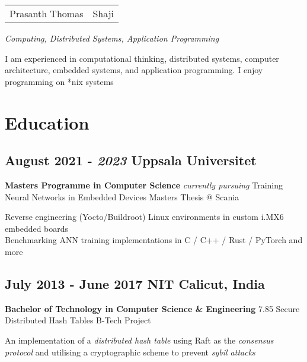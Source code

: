 \documentclass{scrartcl}
\begin{document}
\newcommand{\hll}[1]{{\color{RawSienna}#1}}
\newcommand{\hlp}[1]{{\color{Maroon}#1}}

	\begin{center}
		\begin{tabular}{rl}
			\huge Prasanth Thomas & \huge Shaji
		\end{tabular}
	\end{center}

	\begin{center}
		\itshape Computing, Distributed Systems, Application Programming
	\end{center}

	\vfill

	I am experienced in computational thinking, distributed systems, computer architecture, embedded systems, and application programming. I enjoy programming on *nix systems

	\section{Education}

		\subsection[Uppsala Universitet]{August 2021 - \textit{2023} \hfill Uppsala Universitet}
		\textbf{\large Masters Programme in Computer Science} \hfill \textit{currently pursuing} \newline
		Training Neural Networks in Embedded Devices \hfill Masters Thesis @ Scania

		Reverse engineering (\hlp{Yocto}/\hlp{Buildroot}) Linux environments in custom i.MX6 embedded boards \\
		Benchmarking ANN training implementations in \hll{C} / \hll{C++} / \hll{Rust} / \hlp{PyTorch} and more

		\subsection[NITC]{July 2013 - June 2017 \hfill NIT Calicut, India}
		\textbf{\large Bachelor of Technology in Computer Science \& Engineering} \hfill 7.85 \newline
		Secure Distributed Hash Tables \hfill B-Tech Project

	An implementation of a \textit{distributed hash table} using \hlp{Raft} as the \textit{consensus protocol} and utilising a cryptographic scheme to prevent \textit{sybil attacks}
\end{document}
